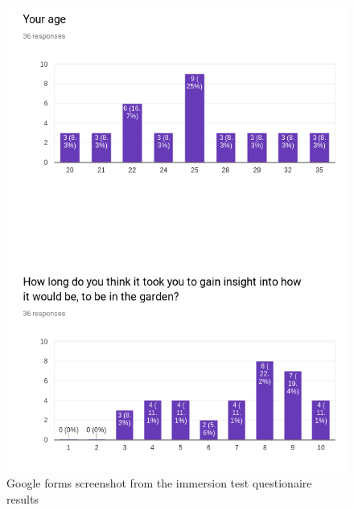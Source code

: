 \begin{multicols}{2}
\begin{figure}[H]
		\includegraphics[width=1.0\linewidth]{include/Appendices/immersionQuestionnaire/3.png}
		\caption{Google forms screenshot from the immersion test questionaire results}
	\end{figure}
	\begin{figure}[H]

\end{figure}
\end{multicols}
